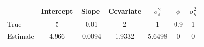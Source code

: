\begin{tabular}{lcccccc}
\toprule
& Intercept & Slope & Covariate & $\sigma_\varepsilon^2$ & $\phi$ & $\sigma_\eta^2$ \\
\midrule
True & 5 & -0.01 & 2 & 1 & 0.9 & 1 \\
Estimate & 4.966 & -0.0094 & 1.9332 & 5.6498 & 0 & 0 \\
\bottomrule
\end{tabular}
